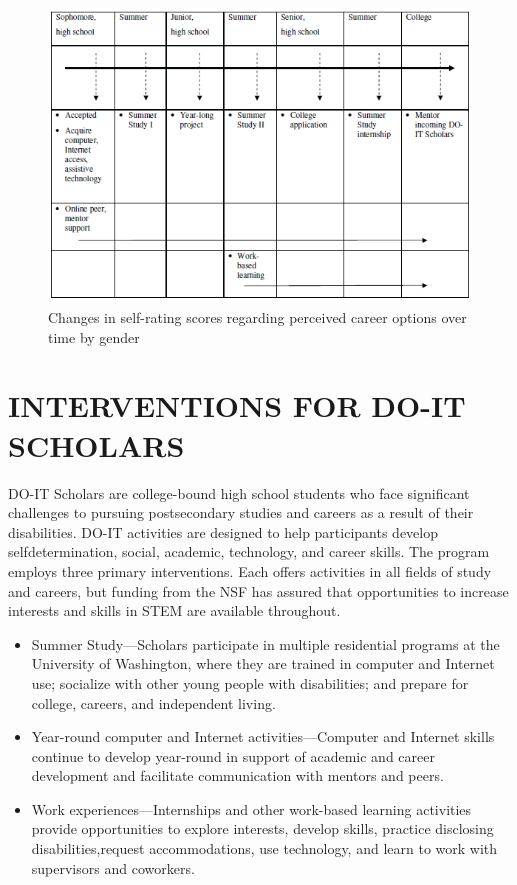 \documentclass[11.5pt]{sig-alternate} %
\begin{document}
\begin{large}
\begin{figure}[h]
    \centering
    \includegraphics[width=1\linewidth]{fig1.png}
    \caption{Changes in self-rating scores regarding perceived career options over time by gender }
\end{figure}
 
\section*{INTERVENTIONS FOR DO-IT SCHOLARS }
 
DO-IT Scholars are college-bound high school students who face significant challenges to pursuing postsecondary studies and careers as a result of their disabilities. DO-IT activities are designed to help participants develop selfdetermination, social, academic, technology, and career skills. The program employs three primary interventions. Each offers activities in all fields of study and careers, but funding from the NSF has assured that opportunities to increase interests and skills in STEM are available throughout.  
 
\begin{itemize}
    \item 	Summer Study—Scholars participate in multiple residential programs at the University of Washington, where they are trained in computer and Internet use; socialize with other young people with disabilities; and prepare for college, careers, and independent living.
    \item 	Year-round computer and Internet activities—Computer and Internet skills continue to develop year-round in support of academic and career development and facilitate communication with mentors and peers.
    \item 	Work experiences—Internships and other work-based learning activities provide opportunities to explore interests, develop skills, practice disclosing disabilities,request accommodations, use technology, and learn to work with supervisors and coworkers.
\end{itemize}
 

\end{large}
\end{document}
